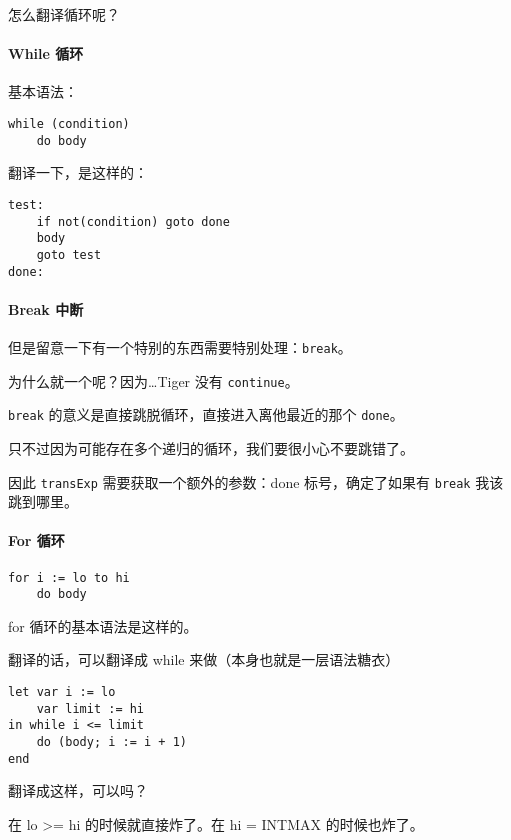 \documentclass[
]{article}
\begin{document}
怎么翻译循环呢？

\hypertarget{header-n51}{%
\paragraph{While 循环}\label{header-n51}}

基本语法：

\begin{verbatim}
while (condition)
	do body
\end{verbatim}

翻译一下，是这样的：

\begin{verbatim}
test:
	if not(condition) goto done
	body
	goto test
done:
\end{verbatim}

\hypertarget{header-n56}{%
\paragraph{Break 中断}\label{header-n56}}

但是留意一下有一个特别的东西需要特别处理：\texttt{break}。

为什么就一个呢？因为\ldots Tiger 没有 \texttt{continue}。

\texttt{break} 的意义是直接跳脱循环，直接进入离他最近的那个
\texttt{done}。

只不过因为可能存在多个递归的循环，我们要很小心不要跳错了。

因此 \texttt{transExp} 需要获取一个额外的参数：done 标号，确定了如果有
\texttt{break} 我该跳到哪里。

\hypertarget{header-n62}{%
\paragraph{For 循环}\label{header-n62}}

\begin{verbatim}
for i := lo to hi
	do body
\end{verbatim}

for 循环的基本语法是这样的。

翻译的话，可以翻译成 while 来做（本身也就是一层语法糖衣）

\begin{verbatim}
let var i := lo
	var limit := hi
in while i <= limit
	do (body; i := i + 1)
end
\end{verbatim}

翻译成这样，可以吗？

在 lo \textgreater= hi 的时候就直接炸了。在 hi = INTMAX 的时候也炸了。
\end{document}
